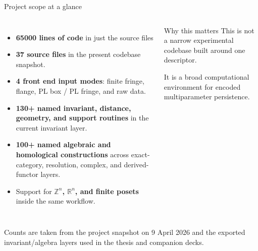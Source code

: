 \documentclass[aspectratio=169,11pt]{beamer}
\begin{document}
\begin{frame}{Project scope at a glance}
\small
\begin{columns}[T,totalwidth=\textwidth]
\begin{itemize}
  \item \textbf{65000 lines of code} in just the source files
  \item \textbf{37 source files} in the present codebase snapshot.
  \item \textbf{4 front end input modes}: finite fringe, flange, PL box / PL fringe, and raw data.
  \item \textbf{130+ named invariant, distance, geometry, and support routines} in the current invariant layer.
  \item \textbf{100+ named algebraic and homological constructions} across exact-category, resolution, complex, and derived-functor layers.
  \item Support for \textbf{$\mathbb{Z}^n$, $\mathbb{R}^n$, and finite posets} inside the same workflow.
\end{itemize}

\begin{block}{Why this matters}
This is not a narrow experimental codebase built around one descriptor.

\medskip
It is a broad computational environment for encoded multiparameter persistence.
\end{block}
\end{columns}
\vfill
{\tiny Counts are taken from the project snapshot on 9 April 2026 and the exported invariant/algebra layers used in the thesis and companion decks.}
\end{frame}
\end{document}
